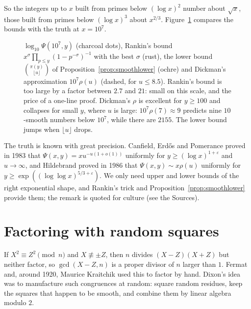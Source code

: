 So the integers up to $x$ built from primes below $(\log x)^2$ number about $\sqrt x$, those built from primes below $(\log x)^3$ about $x^{2/3}$. Figure~\ref{fig:smooth} compares the bounds with the truth at $x=10^7$.

\begin{figure}[ht]
\centering{}
\caption{$\log_{10}\Psi(10^7,y)$ (charcoal dots), Rankin's bound $x^\sigma\prod_{p\le y}(1-p^{-\sigma})^{-1}$ with the best $\sigma$ (rust), the lower bound $\binom{\pi(y)}{\lfloor u\rfloor}$ of Proposition~\ref{prop:smoothlower} (ochre) and Dickman's approximation $10^7\rho(u)$ (dashed, for $u\le8.5$). Rankin's bound is too large by a factor between $2.7$ and $21$: small on this scale, and the price of a one-line proof. Dickman's $\rho$ is excellent for $y\ge100$ and collapses for small $y$, where $u$ is large: $10^7\rho(7)\approx9$ predicts nine $10$-smooth numbers below $10^7$, while there are $2155$. The lower bound jumps when $\lfloor u\rfloor$ drops.}
\label{fig:smooth}
\end{figure}

\begin{remark}
The truth is known with great precision. Canfield, Erd\H{o}s and Pomerance proved in 1983 that $\Psi(x,y)=xu^{-u(1+o(1))}$ uniformly for $y\ge(\log x)^{1+\varepsilon}$ and $u\to\infty$, and Hildebrand proved in 1986 that $\Psi(x,y)\sim x\rho(u)$ uniformly for $y\ge\exp((\log\log x)^{5/3+\varepsilon})$. We only need upper and lower bounds of the right exponential shape, and Rankin's trick and Proposition~\ref{prop:smoothlower} provide them; the remark is quoted for culture (see the Sources).
\end{remark}

\section{Factoring with random squares}\label{sec:dixon}

If $X^2\equiv Z^2\pmod n$ and $X\not\equiv\pm Z$, then $n$ divides $(X-Z)(X+Z)$ but neither factor, so $\gcd(X-Z,n)$ is a proper divisor of $n$ larger than $1$. Fermat and, around 1920, Maurice Kraitchik used this to factor by hand. Dixon's idea was to manufacture such congruences at random: square random residues, keep the squares that happen to be smooth, and combine them by linear algebra modulo $2$.

